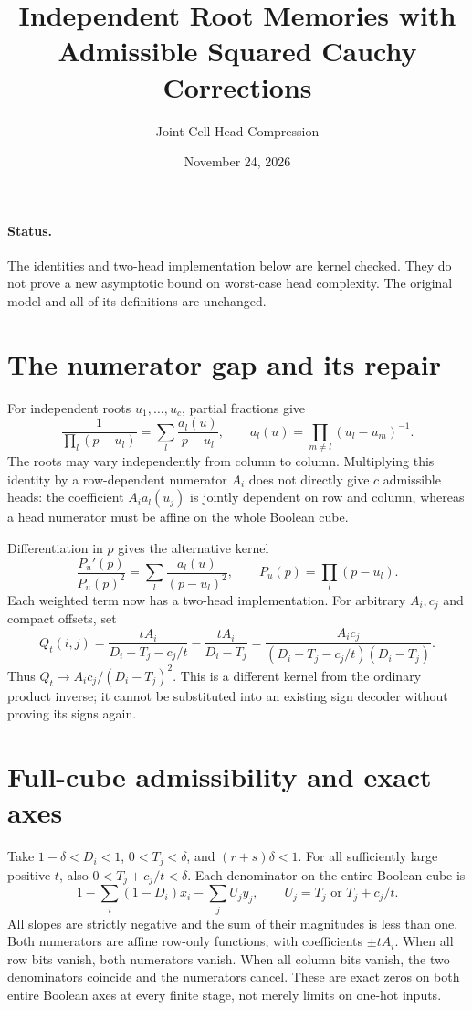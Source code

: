 \documentclass[11pt]{article}
\title{Independent Root Memories with Admissible Squared Cauchy Corrections}
\author{Joint Cell Head Compression}
\date{November 24, 2026}
\begin{document}
\maketitle
\paragraph{Status.} The identities and two-head implementation below are
kernel checked. They do not prove a new asymptotic bound on worst-case head
complexity. The original model and all of its definitions are unchanged.

\section{The numerator gap and its repair}
For independent roots $u_1,\ldots,u_c$, partial fractions give
\[
 \frac1{\prod_l(p-u_l)}=\sum_l\frac{a_l(u)}{p-u_l},
 \qquad a_l(u)=\prod_{m\ne l}(u_l-u_m)^{-1}.
\]
The roots may vary independently from column to column. Multiplying this
identity by a row-dependent numerator $A_i$ does not directly give $c$
admissible heads: the coefficient $A_i a_l(u_j)$ is jointly dependent on
row and column, whereas a head numerator must be affine on the whole
Boolean cube.

Differentiation in $p$ gives the alternative kernel
\[
 \frac{P_u'(p)}{P_u(p)^2}
 =\sum_l\frac{a_l(u)}{(p-u_l)^2},\qquad P_u(p)=\prod_l(p-u_l).
\]
Each weighted term now has a two-head implementation. For arbitrary
$A_i,c_j$ and compact offsets, set
\[
 Q_t(i,j)=\frac{tA_i}{D_i-T_j-c_j/t}
          -\frac{tA_i}{D_i-T_j}
 =\frac{A_i c_j}{(D_i-T_j-c_j/t)(D_i-T_j)}.
\]
Thus $Q_t\to A_i c_j/(D_i-T_j)^2$. This is a different kernel from the
ordinary product inverse; it cannot be substituted into an existing
sign decoder without proving its signs again.

\section{Full-cube admissibility and exact axes}
Take $1-\delta<D_i<1$, $0<T_j<\delta$, and $(r+s)\delta<1$.
For all sufficiently large positive $t$, also
$0<T_j+c_j/t<\delta$. Each denominator on the entire Boolean cube is
\[
 1-\sum_i(1-D_i)x_i-\sum_j U_jy_j,
 \qquad U_j=T_j\text{ or }T_j+c_j/t.
\]
All slopes are strictly negative and the sum of their magnitudes is less
than one. Both numerators are affine row-only functions, with coefficients
$\pm tA_i$. When all row bits vanish, both numerators vanish. When all
column bits vanish, the two denominators coincide and the numerators cancel.
These are exact zeros on both entire Boolean axes at every finite stage,
not merely limits on one-hot inputs.
\end{document}
